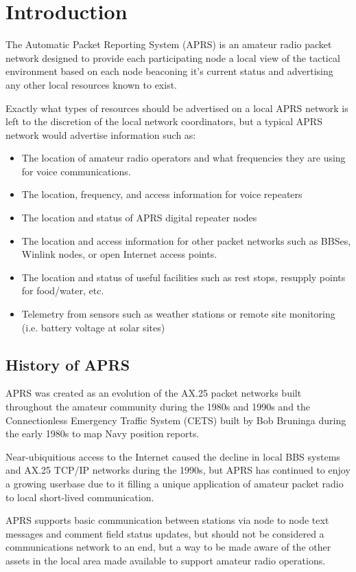 \chapter{Introduction}

The Automatic Packet Reporting System (APRS) is an amateur radio packet
network designed to provide each participating node a local view of the 
tactical environment based on each node beaconing it's current status
and advertising any other local resources known to exist.

Exactly what types of resources should be advertised on a local APRS
network is left to the discretion of the local network coordinators, but
a typical APRS network would advertise information such as:
\begin{itemize}
\item The location of amateur radio operators and what frequencies they are using for voice communications.
\item The location, frequency, and access information for voice repeaters
\item The location and status of APRS digital repeater nodes
\item The location and access information for other packet networks such as BBSes, Winlink nodes, or open Internet access points.
\item The location and status of useful facilities such as rest stops, resupply points for food/water, etc.
\item Telemetry from sensors such as weather stations or remote site monitoring (i.e. battery voltage at solar sites)
\end{itemize} 

\section{History of APRS}

APRS was created as an evolution of the AX.25 packet networks
built throughout the amateur community during the 1980s and 1990s and 
the Connectionless Emergency Traffic System (CETS) built by 
Bob Bruninga during the early 1980s to map Navy position reports.

Near-ubiquitious access to the Internet caused the decline in local BBS 
systems and AX.25 TCP/IP networks during the 1990s, but APRS has 
continued to enjoy a growing userbase due to it filling a unique 
application of amateur packet radio to local short-lived communication.

APRS supports basic communication between stations via node to node 
text messages and comment field status updates, but should not be 
considered a communications network to an end, but a way to be made aware
of the other assets in the local area made available to support amateur 
radio operations.


